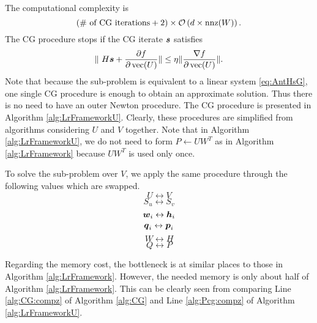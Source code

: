 The computational complexity is
\begin{equation*}
(\text{\# of CG iterations}+2)\times \mathcal{O}\left( d \times \text{nnz}(W)\right).
\end{equation*}
The CG procedure stops if the CG iterate $\boldsymbol{s}$ satisfies
\begin{equation}
    \|\ H\boldsymbol{s} + \frac{\partial f}{\partial \operatorname*{vec}(U)} \| \le \eta \| \frac{\nabla f}{\partial \operatorname*{vec}(U)} \|.
    \label{eq:AntStopMsub}
\end{equation}
Note that because the sub-problem is equivalent to a linear system \eqref{eq:AntHsG}, one single CG procedure is enough to obtain an approximate solution. Thus there is no need to have an outer Newton procedure. The CG procedure is presented in Algorithm \ref{alg:LrFrameworkU}.
Clearly, these procedures are simplified from algorithms considering $U$ and $V$ together. Note that in Algorithm \ref{alg:LrFrameworkU}, we do not need to form $P \gets UW^T$ as in Algorithm \ref{alg:LrFramework} because $UW^T$ is used only once.

To solve the sub-problem over $V$, we apply the same procedure through the following values which are swapped.
$$ U \leftrightarrow V $$
$$ S_u \leftrightarrow S_v $$
$$ \boldsymbol{w}_i \leftrightarrow \boldsymbol{h}_i $$
$$ \boldsymbol{q}_i \leftrightarrow \boldsymbol{p}_i $$
$$ W \leftrightarrow H $$
$$ Q \leftrightarrow P $$

Regarding the memory cost, the bottleneck is at similar places to those in Algorithm \ref{alg:LrFramework}. However, the needed memory is only about half of Algorithm \ref{alg:LrFramework}. This can be clearly seen from comparing Line \ref{alg:CG:compz} of Algorithm \ref{alg:CG} and Line \ref{alg:Pcg:compz} of Algorithm \ref{alg:LrFrameworkU}.